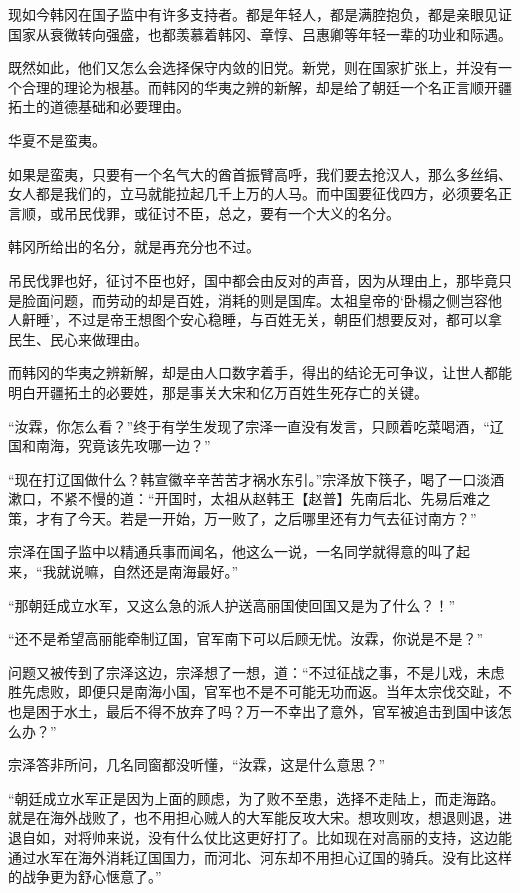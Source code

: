 现如今韩冈在国子监中有许多支持者。都是年轻人，都是满腔抱负，都是亲眼见证国家从衰微转向强盛，也都羡慕着韩冈、章惇、吕惠卿等年轻一辈的功业和际遇。

既然如此，他们又怎么会选择保守内敛的旧党。新党，则在国家扩张上，并没有一个合理的理论为根基。而韩冈的华夷之辨的新解，却是给了朝廷一个名正言顺开疆拓土的道德基础和必要理由。

华夏不是蛮夷。

如果是蛮夷，只要有一个名气大的酋首振臂高呼，我们要去抢汉人，那么多丝绢、女人都是我们的，立马就能拉起几千上万的人马。而中国要征伐四方，必须要名正言顺，或吊民伐罪，或征讨不臣，总之，要有一个大义的名分。

韩冈所给出的名分，就是再充分也不过。

吊民伐罪也好，征讨不臣也好，国中都会由反对的声音，因为从理由上，那毕竟只是脸面问题，而劳动的却是百姓，消耗的则是国库。太祖皇帝的‘卧榻之侧岂容他人鼾睡’，不过是帝王想图个安心稳睡，与百姓无关，朝臣们想要反对，都可以拿民生、民心来做理由。

而韩冈的华夷之辨新解，却是由人口数字着手，得出的结论无可争议，让世人都能明白开疆拓土的必要姓，那是事关大宋和亿万百姓生死存亡的关键。

“汝霖，你怎么看？”终于有学生发现了宗泽一直没有发言，只顾着吃菜喝酒，“辽国和南海，究竟该先攻哪一边？”

“现在打辽国做什么？韩宣徽辛辛苦苦才祸水东引。”宗泽放下筷子，喝了一口淡酒漱口，不紧不慢的道：“开国时，太祖从赵韩王【赵普】先南后北、先易后难之策，才有了今天。若是一开始，万一败了，之后哪里还有力气去征讨南方？”

宗泽在国子监中以精通兵事而闻名，他这么一说，一名同学就得意的叫了起来，“我就说嘛，自然还是南海最好。”

“那朝廷成立水军，又这么急的派人护送高丽国使回国又是为了什么？！”

“还不是希望高丽能牵制辽国，官军南下可以后顾无忧。汝霖，你说是不是？”

问题又被传到了宗泽这边，宗泽想了一想，道：“不过征战之事，不是儿戏，未虑胜先虑败，即便只是南海小国，官军也不是不可能无功而返。当年太宗伐交趾，不也是困于水土，最后不得不放弃了吗？万一不幸出了意外，官军被追击到国中该怎么办？”

宗泽答非所问，几名同窗都没听懂，“汝霖，这是什么意思？”

“朝廷成立水军正是因为上面的顾虑，为了败不至患，选择不走陆上，而走海路。就是在海外战败了，也不用担心贼人的大军能反攻大宋。想攻则攻，想退则退，进退自如，对将帅来说，没有什么仗比这更好打了。比如现在对高丽的支持，这边能通过水军在海外消耗辽国国力，而河北、河东却不用担心辽国的骑兵。没有比这样的战争更为舒心惬意了。”

